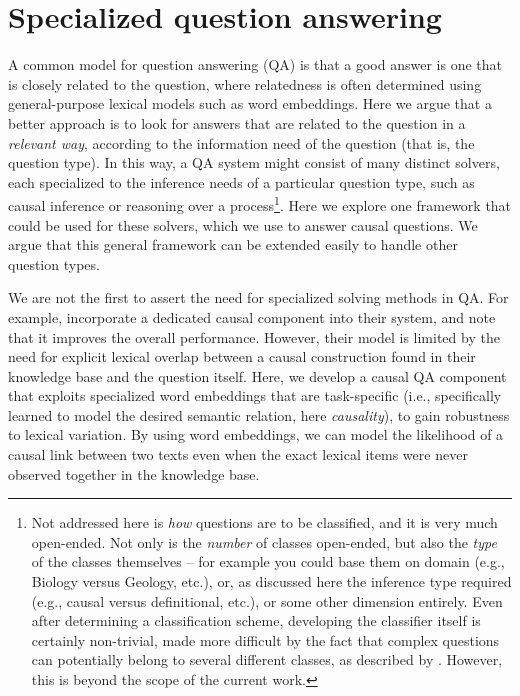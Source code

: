 \section{Specialized question answering}

A common model for question answering (QA) is that a good answer is one that is closely related to the question, where relatedness is often determined using general-purpose lexical models such as word embeddings. 
Here we argue that a better approach is to look for answers that are related to the question in a {\em relevant way}, according to the information need of the question (that is, the question type).
In this way, a QA system might consist of many distinct solvers, each specialized to the inference needs of a particular question type, such as causal inference or reasoning over a process\footnote{Not addressed here is \textit{how} questions are to be classified, and it is very much open-ended. Not only is the \textit{number} of classes open-ended, but also the \textit{type} of the classes themselves -- for example you could base them on domain (e.g., Biology versus Geology, etc.), or, as discussed here the inference type required (e.g., causal versus definitional, etc.), or some other dimension entirely.  Even after determining a classification scheme, developing the classifier itself is certainly non-trivial, made more difficult by the fact that complex questions can potentially belong to several different classes, as described by \citet{jansen-EtAl:2016:COLING}.  However, this is beyond the scope of the current work.}.  Here we explore one framework that could be used for these solvers, which we use to answer causal questions.  We argue that this general framework can be extended easily to handle other question types.

We are not the first to assert the need for specialized solving methods in QA.  For example, \citet{oh2013question} incorporate a dedicated causal component into their system, and note that it improves the overall performance.  However, their model is limited by the need for explicit lexical overlap between a causal construction found in their knowledge base and the question itself.  Here, we develop a causal QA component that exploits specialized word embeddings that are task-specific (i.e., specifically learned to model the desired semantic relation, here \textit{causality}), to gain robustness to lexical variation.  
By using word embeddings, we can model the likelihood of a causal link between two texts even when the exact lexical items were never observed together in the knowledge base.

